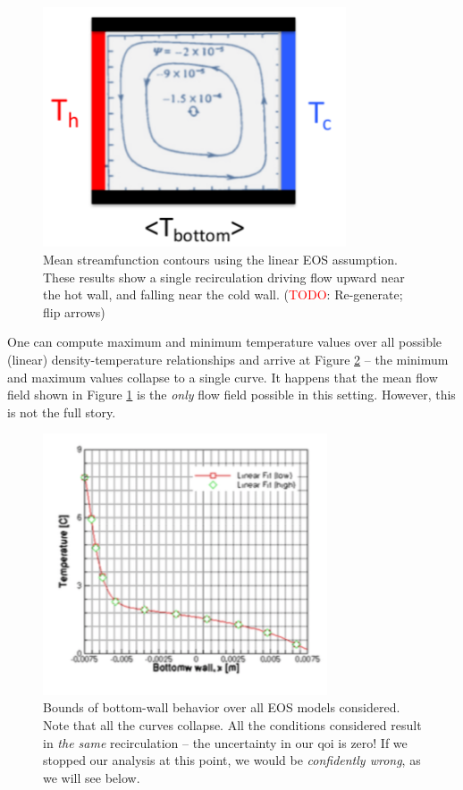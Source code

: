 \documentclass[../primer.tex]{subfiles}
\begin{document}
\begin{figure}[!ht]
  \includegraphics[width=0.80\textwidth]{./images/cavity_single}
  \caption{Mean streamfunction contours using the linear EOS assumption. These
    results show a single recirculation driving flow upward near the hot wall,
    and falling near the cold wall. (\textcolor{red}{TODO}: Re-generate; flip
    arrows)}
  \label{fig:cavity-single}
\end{figure}

One can compute maximum and minimum temperature values over all possible
(linear) density-temperature relationships and arrive at Figure
\ref{fig:bot-wall-single} -- the minimum and maximum values collapse to a single
curve. It happens that the mean flow field shown in Figure
\ref{fig:cavity-single} is the \emph{only} flow field possible in this setting.
However, this is not the full story.

\begin{figure}[!ht]
  \includegraphics[width=0.75\textwidth]{./images/bot_wall_single}
  \caption{Bounds of bottom-wall behavior over all EOS models considered. Note
    that all the curves collapse. All the conditions considered result in
    \emph{the same} recirculation -- the uncertainty in our qoi is zero! If we
    stopped our analysis at this point, we would be \emph{confidently wrong}, as
    we will see below.}
  \label{fig:bot-wall-single}
\end{figure}
\end{document}
